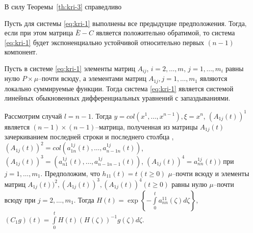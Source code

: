 В силу Теоремы~\ref{th:kri-3} справедливо

\begin{statement}\label{st:kri-1}
    Пусть для системы \eqref{eq:kri-1} выполнены все
    предыдущие предположения. Тогда, если при этом матрица $\bar E - C$
    является положительно обратимой, то система \eqref{eq:kri-1} будет
    экспоненциально устойчивой относительно первых $(n-1)$ компонент.
\end{statement}

Пусть в системе \eqref{eq:kri-1} элементы матриц $A_{ij}$, $i = 2, \dots, m$, $j = 1, \dots, m_i$ равны нулю $P\times\mu$--почти всюду, а элементами матриц
$A_{1j}, j = 1, \dots, m_1$ являются локально суммируемые функции.
Тогда система \eqref{eq:kri-1} является системой линейных обыкновенных
дифференциальных уравнений с запаздываниями.

Рассмотрим случай  $l = n-1$. Тогда $y = col(x^1,\dots,x^{n-1}), \xi =
x^n$, $(A_{1j}(t))^1$ является $(n-1)\times (n-1)$--матрица,
полученная из матрицы $A_{1j}(t)$ зачеркиванием последней строки и
последнего столбца , $(A_{1j}(t))^2 =
col(a^{1j}_{1n}(t),\dots,a^{1j}_{n-1 n}(t))$, $(A_{1j}(t))^3 =
(a^{1j}_{n1}(t),\dots,a^{1j}_{n-1n-1}(t))$, $(A_{1j}(t))^4 =
a^{1j}_{nn}(t))$ при $j = 1,\dots,m_1 $. Предположим, что $h_{11}(t) =
t \, (t \geq 0)$ $\mu $--почти всюду и элементы матриц
$A_{1j}(t))^2, (A_{1j}(t))^3, (A_{1j}(t))^4 (t \geq 0)$ равны нулю
$\mu $--почти всюду при $j = 2,\dots,m_1 $. Тогда $H(t) = \exp \left
\{-\int \limits _{0}^t a^{11}_{nn}(\zeta)d\zeta \right \}$,
$(C_1g)(t) = \int \limits _{0}^tH(t)(H(\zeta))^{-1}g(\zeta)d\zeta$.

